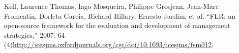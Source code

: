 Kell, Laurence Thomas, Iago Mosqueira, Philippe Grosjean, Jean-Marc
Fromentin, Dorleta Garcia, Richard Hillary, Ernesto Jardim, et al.
``FLR: an open-source framework for the evaluation and development of
management strategies,'' 2007. 64
(4)\url{http://icesjms.oxfordjournals.org/cgi/doi/10.1093/icesjms/fsm012}.

